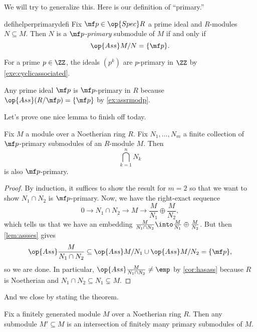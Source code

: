 We will try to generalize this. Here is our definition of ``primary.''
\begin{restatable}[Primary]{defihelper}{primarydefi} 
	Fix $\mf p\in\op{Spec}R$ a prime ideal and $R$-modules $N\subseteq M$. Then $N$ is a \textit{$\mf p$-primary} submodule of $M$ if and only if
	\[\op{Ass}M/N=\{\mf p\}.\]
\end{restatable}
\begin{example}
	For a prime $p\in\ZZ$, the ideals $\left(p^k\right)$ are $p$-primary in $\ZZ$ by \autoref{exe:cyclicassociated}.
\end{example}
\begin{example}
	Any prime ideal $\mf p$ is $\mf p$-primary in $R$ because $\op{Ass}(R/\mf p)=\{\mf p\}$ by \autoref{ex:assrmodp}.
\end{example}
Let's prove one nice lemma to finish off today.
\begin{lemma} \label{lem:intersectprimary}
	Fix $M$ a module over a Noetherian ring $R$. Fix $N_1,\ldots,N_m$ a finite collection of $\mf p$-primary submodules of an $R$-module $M$. Then
	\[\bigcap_{k=1}^nN_k\]
	is also $\mf p$-primary.
\end{lemma}
\begin{proof}
	By induction, it suffices to show the result for $m=2$ so that we want to show $N_1\cap N_2$ is $\mf p$-primary. Now, we have the right-exact sequence
	\[0\to N_1\cap N_2\to M\to\frac M{N_1}\oplus\frac M{N_2},\]
	which tells us that we have an embedding $\frac M{N_1\cap N_2}\into\frac M{N_1}\oplus\frac M{N_2}$. But then \autoref{lem:assses} gives
	\[\op{Ass}\frac M{N_1\cap N_2}\subseteq\op{Ass}M/N_1\cup\op{Ass}M/N_2=\{\mf p\},\]
	so we are done. In particular, $\op{Ass}\frac M{N_1\cap N_2}\ne\emp$ by \autoref{cor:hasass} because $R$ is Noetherian and $N_1\cap N_2\subseteq N_1\subsetneq M$.
\end{proof}
And we close by stating the theorem.
\begin{theorem}
	Fix a finitely generated module $M$ over a Noetherian ring $R$. Then any submodule $M'\subseteq M$ is an intersection of finitely many primary submodules of $M$.
\end{theorem}